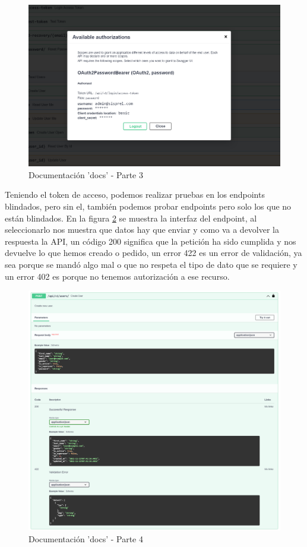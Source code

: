 \begin{figure}[!htb]
    \centering
    \includegraphics[scale=.30]{TT/img/implementacion/docs_3.png}
    \caption{Documentación 'docs' - Parte 3}
    \label{graphic:docs3}
\end{figure}

Teniendo el token de acceso, podemos realizar pruebas en los endpoints blindados, pero sin el, también podemos probar endpoints pero solo los que no están blindados. En la figura \ref{graphic:docs4} se muestra la interfaz del endpoint, al seleccionarlo nos muestra que datos hay que enviar y como va a devolver la respuesta la API, un código 200 significa que la petición ha sido cumplida y nos devuelve lo que hemos creado o pedido, un error 422 es un error de validación, ya sea porque se mandó algo mal o que no respeta el tipo de dato que se requiere y un error 402 es porque no tenemos autorización a ese recurso.

\begin{figure}[!htb]
    \centering
    \includegraphics[scale=.20]{TT/img/implementacion/docs_4.png}
    \caption{Documentación 'docs' - Parte 4}
    \label{graphic:docs4}
\end{figure}

